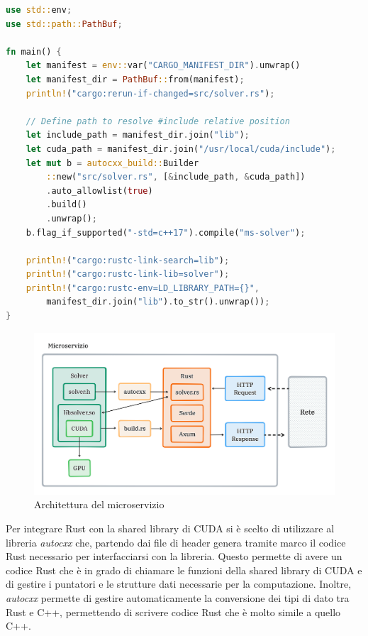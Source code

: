 \vspace{5mm}
\begin{lstlisting}[language=Rust, caption=build.rs, label=lis:build_rs]
use std::env;
use std::path::PathBuf;

fn main() {
    let manifest = env::var("CARGO_MANIFEST_DIR").unwrap()
    let manifest_dir = PathBuf::from(manifest);
    println!("cargo:rerun-if-changed=src/solver.rs");

    // Define path to resolve #include relative position
    let include_path = manifest_dir.join("lib");
    let cuda_path = manifest_dir.join("/usr/local/cuda/include");
    let mut b = autocxx_build::Builder
        ::new("src/solver.rs", [&include_path, &cuda_path])
        .auto_allowlist(true)
        .build()
        .unwrap();
    b.flag_if_supported("-std=c++17").compile("ms-solver");

    println!("cargo:rustc-link-search=lib");
    println!("cargo:rustc-link-lib=solver");
    println!("cargo:rustc-env=LD_LIBRARY_PATH={}", 
        manifest_dir.join("lib").to_str().unwrap());
}
\end{lstlisting}
\vspace{5mm}

\begin{figure}[ht]
    \centering
    \includegraphics[width=1\linewidth]{images/chapter6/micro_arch.png}
    \caption{Architettura del microservizio}
    \label{fig:micro_arch}
\end{figure}


Per integrare Rust con la shared library di CUDA si è scelto di utilizzare al libreria \textit{autocxx} che, partendo dai file di header genera tramite marco il codice Rust necessario per interfacciarsi con la libreria. Questo permette di avere un codice Rust che è in grado di chiamare le funzioni della shared library di CUDA e di gestire i puntatori e le strutture dati necessarie per la computazione. Inoltre, \textit{autocxx} permette di gestire automaticamente la conversione dei tipi di dato tra Rust e C++, permettendo di scrivere codice Rust che è molto simile a quello C++.



